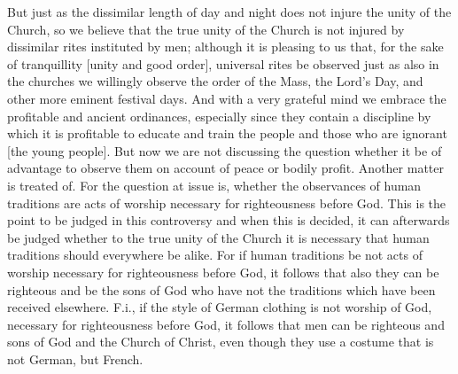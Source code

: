 But just as the dissimilar length of day and night does not injure
the unity of the Church, so we believe that the true unity of the
Church is not injured by dissimilar rites instituted by men; although
it is pleasing to us that, for the sake of tranquillity [unity and
good order], universal rites be observed just as also in the churches
we willingly observe the order of the Mass, the Lord's Day, and other
more eminent festival days.  And with a very grateful mind we embrace
the profitable and ancient ordinances, especially since they contain
a discipline by which it is profitable to educate and train the
people and those who are ignorant [the young people].  But now we are
not discussing the question whether it be of advantage to observe
them on account of peace or bodily profit.  Another matter is treated
of.  For the question at issue is, whether the observances of human
traditions are acts of worship necessary for righteousness before God.
This is the point to be judged in this controversy and when this is
decided, it can afterwards be judged whether to the true unity of the
Church it is necessary that human traditions should everywhere be
alike.  For if human traditions be not acts of worship necessary for
righteousness before God, it follows that also they can be righteous
and be the sons of God who have not the traditions which have been
received elsewhere.  F.i., if the style of German clothing is not
worship of God, necessary for righteousness before God, it follows
that men can be righteous and sons of God and the Church of Christ,
even though they use a costume that is not German, but French.

